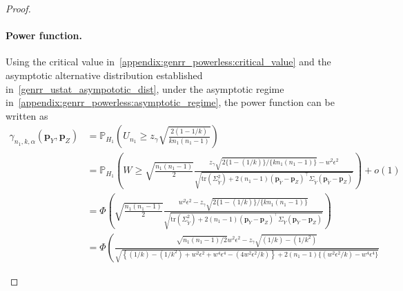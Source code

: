 \documentclass[twoside,11pt]{article}
\newcommand{\rvTwo}{Y}
\newcommand{\rvThree}{Z}
\newcommand{\alphabetSize}{k} %
\newcommand{\sampleSize}{n}
\newcommand{\probVec}{\mathbf{p}} %
\newcommand{\privacyParameter}{\alpha} %
\begin{document}
\begin{appendix}
\begin{proof}
\begin{itemize}
		\paragraph{Power function.}
		Using the critical value in~\eqref{appendix:genrr_powerless:critical_value}
		and the asymptotic alternative distribution established in~\eqref{genrr_ustat_asympototic_dist}, 
		under the asymptotic regime in~\eqref{appendix:genrr_powerless:asymptotic_regime},
		the power function can be written as
		\begin{align*}
			\gamma_{\sampleSize_1, \alphabetSize, \privacyParameter}
			(\probVec_\rvTwo,
			\probVec_\rvThree)
			&=
			\mathbb{P}_{H_1} \!
			\left(
			U_{n_1}
			\geq
			z_{\gamma}
			\sqrt{
				\frac{
					2(1 -  1/ \alphabetSize)}{
					\alphabetSize n_1(n_1-1)}
			}
			\right)
			\\&=
			\mathbb{P}_{H_1} \!
			\left(
			W
			\geq
			\sqrt{
				\frac{
					\sampleSize_1(\sampleSize_1-1)
				}{
					2
				} 
			}
			\frac{z_{\gamma}
				\sqrt{
					2\{1 - ( 1/ \alphabetSize) \}/ \{ \alphabetSize n_1(n_1-1)  \}
				}
				- w^2 \epsilon^2
			}{
				\sqrt{
					\mathrm{tr}(\Sigma_{\tilde{\rvTwo}}^2)
					+
					2(\sampleSize_1 - 1)
					(\probVec_{\tilde{\rvTwo}} - \probVec_\rvThree)^\top 
					\Sigma_{\tilde{\rvTwo}}
					(\probVec_{\tilde{\rvTwo}} - \probVec_\rvThree)	
				}
			}
			\right) + o(1)
			\\&=
			\Phi \!
			\left(
			\sqrt{
				\frac{
					\sampleSize_1(\sampleSize_1-1)
				}{
					2
				} 
			}
			\frac{
				w^2 \epsilon^2
				-
				z_{\gamma}
				\sqrt{
					2\{1 - ( 1/ \alphabetSize) \}/ \{ \alphabetSize n_1(n_1-1)  \}
				}
			}{
				\sqrt{
					\mathrm{tr}(\Sigma_{\tilde{\rvTwo}}^2)
					+
					2(\sampleSize_1 - 1)
					(\probVec_{\tilde{\rvTwo}} - \probVec_\rvThree)^\top 
					\Sigma_{\tilde{\rvTwo}}
					(\probVec_{\tilde{\rvTwo}} - \probVec_\rvThree)	
				}
			}
			\right)
			\\&=
			\Phi \!
			\left(
			\frac{
				\sqrt{
					\sampleSize_1(\sampleSize_1-1)
					/
					2
				}
				w^2 \epsilon^2
				-
				z_{\gamma}
				\sqrt{
					(1/\alphabetSize)
					-
					(1/\alphabetSize^2)
				}
			}{
				\sqrt{
					\left\{
					(1/\alphabetSize)
					-
					(1/\alphabetSize^2)
					+
					w^2 \epsilon^2
					+
					w^4 \epsilon^4
					-
					(4w^2 \epsilon^2/\alphabetSize)
					\right\}
					+
					2(\sampleSize_1 - 1)
					\bigl\{
					(w^2 \epsilon^2/\alphabetSize)
					-
					w^4 \epsilon^4
					\bigr\}	
				}
}
\end{align*}
\end{itemize}
\end{proof}
\end{appendix}
\end{document}
